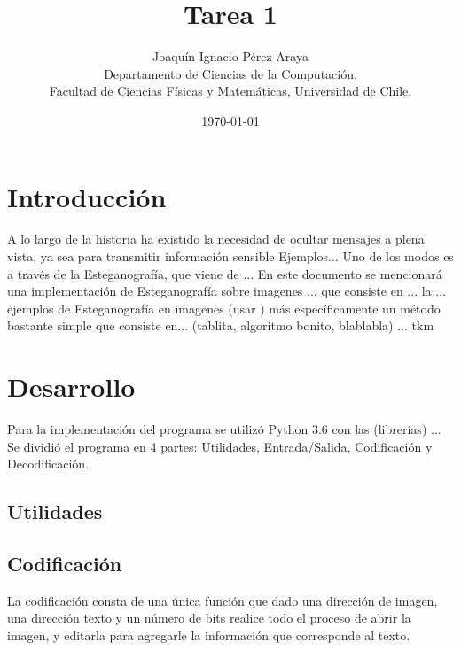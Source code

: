 \documentclass{article}
\begin{document}
\title{Tarea 1 }
\author{Joaquín Ignacio Pérez Araya\footnotemark \\ Departamento de Ciencias de la Computación, \\ Facultad de Ciencias Físicas y Matemáticas, Universidad de Chile.}
\date{\today}


\maketitle

\begin{abstract}

\end{abstract}

\section*{Introducción} %
    A lo largo de la historia ha existido la necesidad de ocultar mensajes a plena vista, ya sea para transmitir información sensible  Ejemplos...
    Uno de los modos es a través de la Esteganografía, que viene de ...
    En este documento se mencionará una implementación de Esteganografía sobre imagenes ... que consiste en ... la
    ... ejemplos de Esteganografía en imagenes (usar \cite{DIS})
    más específicamente un método bastante simple que consiste en...
    (tablita, algoritmo bonito, blablabla)
    ...
    tkm

\section*{Desarrollo}
	Para la implementación del programa se utilizó Python 3.6 con las (librerías) ...
	Se dividió el programa en 4 partes: Utilidades, Entrada/Salida, Codificación y Decodificación.
	\subsection{Utilidades}
	
	\subsection{Codificación}
	 	La codificación consta de una única función que dado una dirección de imagen, una dirección texto y un número de bits realice todo el proceso de abrir la imagen, y editarla para agregarle la información que corresponde al texto.
	 
\end{document}
